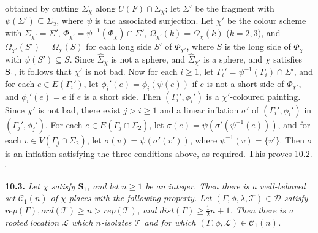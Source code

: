 \noindent obtained by cutting $\Sigma_\chi$ along $U(F) \cap \Sigma_\chi$; let $\Sigma'$ be the fragment with $\psi(\Sigma') \subseteq \Sigma_2$, where $\psi$ is the associated surjection. Let $\chi'$ be the colour scheme with $\Sigma_{\chi'} = \Sigma'$, $\Phi_{\chi'} = \psi^{-1}(\Phi_\chi) \cap \Sigma'$, $\Omega_{\chi'}(k) = \Omega_\chi(k)$ ($k = 2, 3$), and $\Omega_{\chi'}(S') = \Omega_\chi(S)$ for each long side $S'$ of $\Phi_{\chi'}$, where $S$ is the long side of $\Phi_\chi$ with $\psi(S') \subseteq S$. Since $\hat{\Sigma}_\chi$ is not a sphere, and $\hat{\Sigma}_{\chi'}$ is a sphere, and $\chi$ satisfies $\mathbf{S}_1$, it follows that $\chi'$ is not bad. Now for each $i \ge 1$, let $\Gamma_i' = \psi^{-1}(\Gamma_i) \cap \Sigma'$, and for each $e \in E(\Gamma_i')$, let $\phi_i'(e) = \phi_i(\psi(e))$ if $e$ is not a short side of $\Phi_{\chi'}$, and $\phi_i'(e) = e$ if $e$ is a short side. Then $(\Gamma_i', \phi_i')$ is a $\chi'$-coloured painting. Since $\chi'$ is not bad, there exist $j > i \ge 1$ and a linear inflation $\sigma'$ of $(\Gamma_i', \phi_i')$ in $(\Gamma_j', \phi_j')$. For each $e \in E(\Gamma_j \cap \Sigma_2)$, let $\sigma(e) = \psi(\sigma'(\psi^{-1}(e)))$, and for each $v \in V(\Gamma_j \cap \Sigma_2)$, let $\sigma(v) = \psi(\sigma'(v'))$, where $\psi^{-1}(v) = \{v'\}$. Then $\sigma$ is an inflation satisfying the three conditions above, as required. This proves 10.2. $\square$

\textbf{10.3.} \textit{Let $\chi$ satisfy $\mathbf{S}_1$, and let $n \ge 1$ be an integer. Then there is a well-behaved set $\mathscr{C}_1(n)$ of $\chi$-places with the following property. Let $(\Gamma, \phi, \lambda, \mathscr{T}) \in \mathscr{D}$ satisfy $rep(\Gamma), ord(\mathscr{T}) \ge n > rep(\mathscr{T})$, and $dist(\Gamma) \ge \frac{1}{2}n + 1$. Then there is a rooted location $\mathscr{L}$ which $n$-isolates $\mathscr{T}$ and for which $(\Gamma, \phi, \mathscr{L}) \in \mathscr{C}_1(n)$.}

